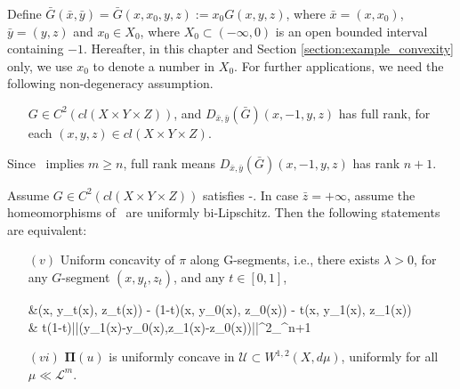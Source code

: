 Define $\bar{G}(\bar{x}, \bar{y})=\bar{G}(x,x_0, y,z) := x_0 G(x, y,z)$, where $\bar{x}=(x, x_0)$, $\bar{y}=(y,z)$ and $x_0\in X_0$, where $X_0 \subset (-\infty, 0)$ is an open bounded interval containing $-1$. Hereafter, in this chapter and Section \ref{section:example_convexity} only, we use $x_0$ to denote a number in $X_0$. For further applications, we need the following non-degeneracy assumption. \medskip

\begin{itemize}
	\item[\Gsix] $G\in C^2(cl(X\times Y \times Z)
	)$, and $D_{\bar{x},\bar{y}}(\bar{G})(x,-1,y,z)$ has full rank, for each $(x,y,z)\in cl(X\times Y\times Z)$. 
\end{itemize}

Since \Gone\ implies $m \ge n$,  full rank means $D_{\bar{x},\bar{y}}(\bar{G})(x,-1,y,z)$ has rank $n+1$.
\medskip


\begin{theorem}\label{maintheorem2}
	Assume $G\in  C^{2}(cl(X\times Y\times Z))$ satisfies \Gzero-{\Gsix}. In case $\bar{z}=+\infty$, assume the homeomorphisms of \Gone\ are uniformly bi-Lipschitz. Then the following statements are equivalent:

	\begin{enumerate}[(i)]	
	\item[$(v)$] Uniform concavity of $\pi$ along G-segments, i.e., there exists $\lambda>0$, for any $G$-segment $(x, y_t, z_t)$, and any $t\in [0,1]$, 
	\begin{flalign}\label{uniformconvavity}
	\begin{split}
	&\pi(x, y_t(x), z_t(x)) - (1-t)\pi(x, y_0(x), z_0(x)) - t\pi(x, y_1(x), z_1(x)) \\
	\ge & t(1-t)\lambda||(y_1(x)-y_0(x),z_1(x)-z_0(x))||^2_{\R^{n+1}}
	\end{split}
	\end{flalign} 
	
	\item[$(vi)$] $\pmb \Pi(u)$ is uniformly concave in $\mathcal{U} \subset W^{1,2}(X,d\mu)$,  uniformly for all $\mu\ll \mathcal{L}^m$. 
	\end{enumerate}
\end{theorem}

